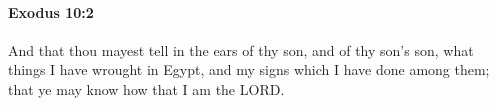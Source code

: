 
		\paragraph{Exodus 10:2} %
			\label{EXODUS-10-2}

			And that thou mayest tell in the ears of thy son, and of thy son's son, what things I have wrought in Egypt, and my signs which I have done among them; that ye may know how that I am the LORD.


